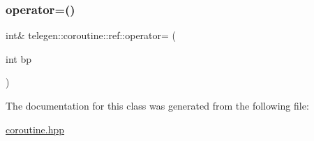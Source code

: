 \mbox{\label{classtelegen_1_1coroutine_1_1ref_a4df06629c2ca9c502184c8e066c64213}} 
\subsubsection{\texorpdfstring{operator=()}{operator=()}}
{\footnotesize\ttfamily int\& telegen\+::coroutine\+::ref\+::operator= (\begin{DoxyParamCaption}\item[{int}]{bp }\end{DoxyParamCaption})\hspace{0.3cm}{\ttfamily [inline]}}



The documentation for this class was generated from the following file\+:\begin{DoxyCompactItemize}
\item 
\hyperlink{coroutine_8hpp}{coroutine.\+hpp}\end{DoxyCompactItemize}
